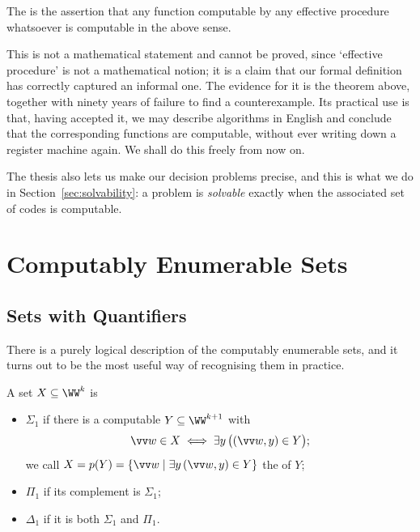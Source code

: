 \begin{definition}
	The  is the assertion that any function computable by any effective procedure whatsoever is computable in the above sense.
\end{definition}

This is not a mathematical statement and cannot be proved, since `effective procedure' is not a mathematical notion; it is a claim that our formal definition has correctly captured an informal one. The evidence for it is the theorem above, together with ninety years of failure to find a counterexample. Its practical use is that, having accepted it, we may describe algorithms in English and conclude that the corresponding functions are computable, without ever writing down a register machine again. We shall do this freely from now on.

\begin{remark}
	The thesis also lets us make our decision problems precise, and this is what we do in Section~\ref{sec:solvability}: a problem is \emph{solvable} exactly when the associated set of codes is computable.
\end{remark}

\section{Computably Enumerable Sets}\label{sec:re}

\subsection{Sets with Quantifiers}

There is a purely logical description of the computably enumerable sets, and it turns out to be the most useful way of recognising them in practice.

\begin{definition}
	A set $X \subseteq \WW^k$ is
	\begin{itemize}
		\item $\Sigma_1$ if there is a computable $Y \subseteq \WW^{k+1}$ with
		$$\vv w \in X \iff \exists y\, \big((\vv w, y) \in Y\big);$$
		we call $X = p(Y) = \{\vv w \mid \exists y\, (\vv w, y) \in Y\}$ the  of $Y$;
		\item $\Pi_1$ if its complement is $\Sigma_1$;
		\item $\Delta_1$ if it is both $\Sigma_1$ and $\Pi_1$.
	\end{itemize}
\end{definition}

